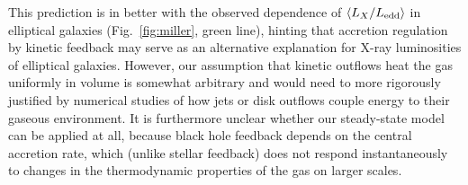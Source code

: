 \documentclass[usenatbib,fleqn]{mn2e}
\begin{document}
This prediction is in better with the observed dependence of $\langle L_{X}/L_{\rm edd} \rangle$ in elliptical galaxies (Fig.~\ref{fig:miller}, green line), hinting that accretion regulation by kinetic feedback may serve as an alternative explanation for X-ray luminosities of elliptical galaxies.  However, our assumption that kinetic outflows heat the gas uniformly in volume is somewhat arbitrary and would need to more rigorously justified by numerical studies of how jets or disk outflows couple energy to their gaseous environment.  It is furthermore unclear whether our steady-state model can be applied at all, because black hole feedback depends on the central accretion rate, which (unlike stellar feedback) does not respond instantaneously to changes in the thermodynamic properties of the gas on larger scales.





\end{document}
